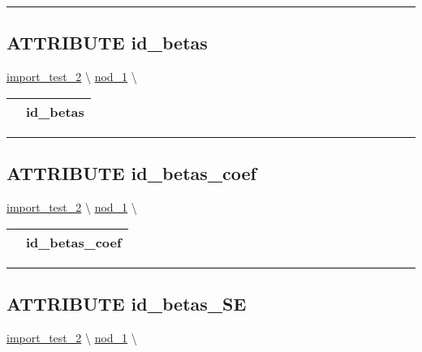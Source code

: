 \rule{\linewidth}{0.5pt}
\subsection*{\textsf{\colorbox{headtoc}{\color{white} ATTRIBUTE}
id\_betas}}

\hypertarget{ecldoc:constants.id_betas}{}
\hspace{0pt} \hyperlink{ecldoc:import_test_2}{import_test_2} \textbackslash 
\hspace{0pt} \hyperlink{ecldoc:Constants}{nod_1} \textbackslash 

{\renewcommand{\arraystretch}{1.5}
\begin{tabularx}{\textwidth}{|>{\raggedright\arraybackslash}l|X|}
\hline
\hspace{0pt}\mytexttt{\color{red} } & \textbf{id\_betas} \\
\hline
\end{tabularx}
}

\par


\rule{\linewidth}{0.5pt}
\subsection*{\textsf{\colorbox{headtoc}{\color{white} ATTRIBUTE}
id\_betas\_coef}}

\hypertarget{ecldoc:constants.id_betas_coef}{}
\hspace{0pt} \hyperlink{ecldoc:import_test_2}{import_test_2} \textbackslash 
\hspace{0pt} \hyperlink{ecldoc:Constants}{nod_1} \textbackslash 

{\renewcommand{\arraystretch}{1.5}
\begin{tabularx}{\textwidth}{|>{\raggedright\arraybackslash}l|X|}
\hline
\hspace{0pt}\mytexttt{\color{red} } & \textbf{id\_betas\_coef} \\
\hline
\end{tabularx}
}

\par


\rule{\linewidth}{0.5pt}
\subsection*{\textsf{\colorbox{headtoc}{\color{white} ATTRIBUTE}
id\_betas\_SE}}

\hypertarget{ecldoc:constants.id_betas_se}{}
\hspace{0pt} \hyperlink{ecldoc:import_test_2}{import_test_2} \textbackslash 
\hspace{0pt} \hyperlink{ecldoc:Constants}{nod_1} \textbackslash 


